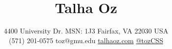 \documentclass[11pt, letter]{article}
\title{Talha Oz}
\author{4400 University Dr. MSN: 1J3 \textbar{} Fairfax, VA 22030 USA\\ 
(571) 201-0575 \textbar{} toz@gmu.edu \textbar{}
\href{http://talhaoz.com}{talhaoz.com} \textbar{}
\href{http://twitter.com/tozCSS}{@tozCSS} }
\date{} %
\begin{document}
\maketitle
\begin{raggedright}
\vspace{-15mm}



\end{raggedright}
\end{document}
